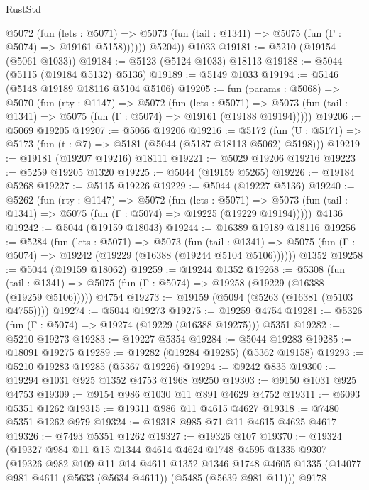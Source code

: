 \begin{lexlean}{RustStd}
\begin{coremodule}
            @5072
              (fun (lets : @5071) =>
              @5073 (fun (tail : @1341) => @5075 (fun (Γ : @5074) => @19161 @5158))))))
        @5204))
    @1033
@19181 := @5210 (@19154 (@5061 @1033))
@19184 := @5123 (@5124 @1033) @18113
@19188 := @5044 (@5115 (@19184 @5132) @5136)
@19189 := @5149 @1033
@19194 := @5146 (@5148 @19189 @18116 @5104 @5106)
@19205 := fun (params : @5068) =>
  @5070
    (fun (rty : @1147) =>
    @5072
      (fun (lets : @5071) =>
      @5073 (fun (tail : @1341) => @5075 (fun (Γ : @5074) => @19161 (@19188 @19194)))))
@19206 := @5069 @19205
@19207 := @5066 @19206
@19216 := @5172
    (fun (U : @5171) => @5173 (fun (t : @7) => @5181 (@5044 (@5187 @18113 @5062) @5198)))
@19219 := @19181 (@19207 @19216) @18111
@19221 := @5029 @19206 @19216
@19223 := @5259 @19205 @1320
@19225 := @5044 (@19159 @5265)
@19226 := @19184 @5268
@19227 := @5115 @19226
@19229 := @5044 (@19227 @5136)
@19240 := @5262
    (fun (rty : @1147) =>
    @5072
      (fun (lets : @5071) =>
      @5073 (fun (tail : @1341) => @5075 (fun (Γ : @5074) => @19225 (@19229 @19194)))))
    @4136
@19242 := @5044 (@19159 @18043)
@19244 := @16389 @19189 @18116
@19256 := @5284
    (fun (lets : @5071) =>
    @5073
      (fun (tail : @1341) =>
      @5075 (fun (Γ : @5074) => @19242 (@19229 (@16388 (@19244 @5104 @5106))))))
    @1352
@19258 := @5044 (@19159 @18062)
@19259 := @19244 @1352
@19268 := @5308
    (fun (tail : @1341) => @5075 (fun (Γ : @5074) => @19258 (@19229 (@16388 (@19259 @5106)))))
    @4754
@19273 := @19159 (@5094 (@5263 (@16381 (@5103 @4755))))
@19274 := @5044 @19273
@19275 := @19259 @4754
@19281 := @5326 (fun (Γ : @5074) => @19274 (@19229 (@16388 @19275))) @5351
@19282 := @5210 @19273
@19283 := @19227 @5354
@19284 := @5044 @19283
@19285 := @18091 @19275
@19289 := @19282 (@19284 @19285) (@5362 @19158)
@19293 := @5210 @19283 @19285 (@5367 @19226)
@19294 := @9242 @835
@19300 := @19294 @1031 @925 @1352 @4753 @1968 @9250
@19303 := @9150 @1031 @925 @4753
@19309 := @9154 @986 @1030 @11 @891 @4629 @4752
@19311 := @6093 @5351 @1262
@19315 := @19311 @986 @11 @4615 @4627
@19318 := @7480 @5351 @1262 @979
@19324 := @19318 @985 @71 @11 @4615 @4625 @4617
@19326 := @7493 @5351 @1262
@19327 := @19326 @107
@19370 := @19324
    (@19327
      @984
      @11
      @15
      @1344
      @4614
      @4624
      @1748
      @4595
      @1335
      @9307
      (@19326
        @982
        @109
        @11
        @14
        @4611
        @1352
        @1346
        @1748
        @4605
        @1335
        (@14077 @981 @4611 (@5633 (@5634 @4611)) (@5485 (@5639 @981 @11)))
        @9178

\end{coremodule}
\end{lexlean}
